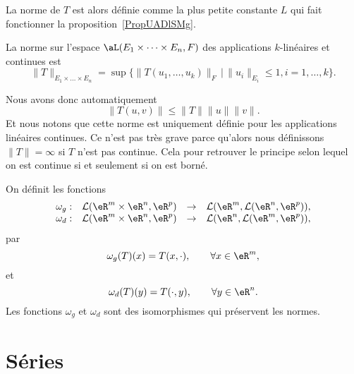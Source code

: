 La norme de \( T\) est alors définie comme la plus petite constante \( L\) qui fait fonctionner la proposition~\ref{PropUADlSMg}.
\begin{definition}  \label{DefKPBYeyG}
	La norme sur l'espace $\aL(E_1\times \cdots\times E_n, F)$ des applications $k$-linéaires et continues est
	\begin{equation}
        \|T\|_{E_1\times \ldots\times E_n}=\sup\{ \|T(u_1, \ldots,u_k)\|_{F}\,\vert\,\|u_i\|_{E_i}\leq 1, i=1,\ldots, k \}.
	\end{equation}
\end{definition}
Nous avons donc automatiquement
\begin{equation}    \label{EqYLnbRbC}
    \| T(u,v) \|\leq \| T \|\| u \|\| v \|.
\end{equation}
Et nous notons que cette norme est uniquement définie pour les applications linéaires continues. Ce n'est pas très grave parce qu'alors nous définissons \( \| T \|=\infty\) si \( T\) n'est pas continue. Cela pour retrouver le principe selon lequel on est continue si et seulement si on est borné.

\begin{proposition}\label{isom_isom}
  On définit les fonctions
  \begin{equation}
    \begin{array}{rccc}
      \omega_g: & \mathcal{L}(\eR^{m}\times\eR^{n}, \eR^p)&\to &\mathcal{L}(\eR^{m}, \mathcal{L}(\eR^{n}, \eR^p)),\\
      \omega_d: & \mathcal{L}(\eR^{m}\times\eR^{n}, \eR^p)&\to &\mathcal{L}(\eR^{n}, \mathcal{L}(\eR^{m}, \eR^p)),
    \end{array}
  \end{equation}
par
\[
\omega_g(T)(x)=T(x,\cdot), \qquad \forall x\in\eR^m,
\]
et
\[
\omega_d(T)(y)=T(\cdot, y), \qquad \forall y\in\eR^n.
\]
Les fonctions $\omega_g$ et $\omega_d$ sont des isomorphismes qui préservent les normes.
\end{proposition}

\section{Séries}
\label{SECooYCQBooSZNXhd}

